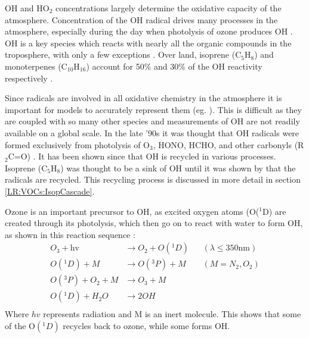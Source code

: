     
    OH and HO$_2$ concentrations largely determine the oxidative capacity of the atmosphere.
    Concentration of the OH radical drives many processes in the atmosphere, especially during the day when photolysis of ozone produces OH \parencite{Atkinson2000}.
    OH is a key species which reacts with nearly all the organic compounds in the troposphere, with only a few exceptions \parencite{Atkinson2000}.
    Over land, isoprene (C$_5$H$_8$) and monoterpenes (C$_{10}$H$_{16}$) account for 50\% and 30\% of the OH reactivity respectively \parencite{Fuentes2000}.
    
    Since radicals are involved in all oxidative chemistry in the atmosphere it is important for models to accurately represent them (eg. \textcite{Travis2014}).
    This is difficult as they are coupled with so many other species and measurements of OH are not readily available on a global scale.
    In the late '90s it was thought that OH radicals were formed exclusively from photolysis of O$_3$, HONO, HCHO, and other carbonyls (R$_2$C=O) \parencite{Atkinson2000}.
    It has been shown since that OH is recycled in various processes.
    Isoprene (C$_5$H$_8$) was thought to be a sink of OH until it was shown by \textcite{Paulot2009b} that the radicals are recycled.
    This recycling process is discussed in more detail in section \ref{LR:VOCs:IsopCascade}.
    
    Ozone is an important precursor to OH, as excited oxygen atoms (O(${}^1$D) are created through its photolysis, which then go on to react with water to form OH, as shown in this reaction sequence \parencite{Atkinson2000, AtkinsonArey2003}:
    \begin{equation}
      \begin{aligned}
        O_3+\text{hv}     & \to  O_2 + O({}^1D)   && (\lambda \le 350 \text{nm}) \\%
        O({}^1D)+M        & \to  O({}^3P) + M     && (M=N_2, O_2)               \\%
        O({}^3P)+O_2 + M  & \to  O_3 + M          &&                           \\%
        O({}^1D)+H_2O     & \to  2OH              &&                            \\%
      \end{aligned}
      \label{LR:Atmos:Chem:eqn_O3toOH}
    \end{equation}
    Where $hv$ represents radiation and M is an inert molecule.
    This shows that some of the O$({}^1D)$ recycles back to ozone, while some forms OH.
      
